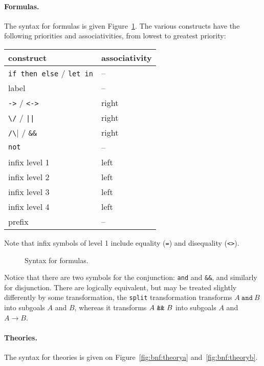 \paragraph{Formulas.}
The syntax for formulas is given Figure~\ref{fig:bnf:formula}.
The various constructs have the following priorities and
associativities, from lowest to greatest priority:
\begin{center}
  \begin{tabular}{|l|l|}
    \hline
    construct & associativity \\
    \hline\hline
    \texttt{if then else} / \texttt{let in} & -- \\
    label & -- \\
    \texttt{->} / \texttt{<->} & right \\
    \verb!\/! / \verb!||! & right \\
    \verb|/\| / \verb!&&! & right \\
    \texttt{not}  & -- \\
    infix level 1 & left \\
    infix level 2 & left \\
    infix level 3 & left \\
    infix level 4 & left \\
    prefix        & --   \\
    \hline
  \end{tabular}
\end{center}
Note that infix symbols of level 1 include equality (\texttt{=}) and
disequality (\texttt{<>}).

\begin{figure}
  \begin{center}\framebox{}\end{center}
  \caption{Syntax for formulas.}
\label{fig:bnf:formula}
\end{figure}

Notice that there are two symbols for the conjunction: \texttt{and}
and \verb|&&|, and similarly for disjunction. There are logically
equivalent, but may be treated slightly differently by some
transformation, \eg{} the \texttt{split} transformation transforms
$A~\texttt{and}~B$ into subgoals $A$ and $B$, whereas it transforms
$A~\verb|&&|~B$ into subgoals $A$ and $A\rightarrow B$.

\paragraph{Theories.}
The syntax for theories is given on Figure~\ref{fig:bnf:theorya} and~\ref{fig:bnf:theoryb}.

